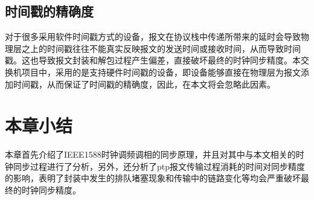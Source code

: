 \subsection{时间戳的精确度}
\label{sec:1588_problem_2}
对于很多采用软件时间戳方式的设备，报文在协议栈中传递所带来的延时会导致物理层之上的时间戳往往不能真实反映报文的发送时间或接收时间，从而导致时间戳\supercite{53}。这也导致报文封装和解包过程产生偏差，直接破坏最终的时钟同步精度。本交换机项目中，采用的是支持硬件时间戳的设备，即设备能够直接在物理层为报文添加时间戳，从而保证了时间戳的精确度，因此，在本文将会忽略此因素。

\section{本章小结}
本章首先介绍了IEEE1588时钟调频调相的同步原理，并且对其中与本文相关的时钟同步过程进行了分析，另外，还分析了ptp报文传输过程消耗的时间对同步精度的影响，表明了封装中发生的排队堵塞现象和传输中的链路变化等均会严重破坏最终的时钟同步精度。



